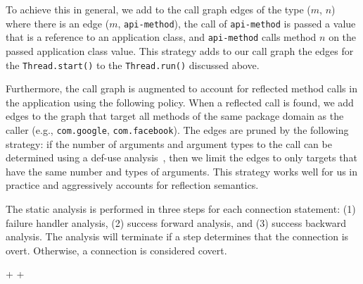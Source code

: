 To achieve this in general, we add to the call graph edges of the type
($m$, $n$) where there is an edge ($m$, \lstinline!api-method!), the
call of \lstinline!api-method! is passed a value that is a reference
to an application class, and \lstinline!api-method! calls method $n$
on the passed application class value.  This strategy adds to our
call graph the edges for the \lstinline!Thread.start()! to the
\lstinline!Thread.run()! discussed above.

Furthermore, the call graph is augmented to account for reflected
method calls in the application using the following policy.  When a
reflected call is found, we add edges to the graph that target all
methods of the same package domain as the caller (e.g.,
\lstinline!com.google!, \lstinline!com.facebook!).  The edges are pruned by the
following strategy: if the number of arguments and argument types to
the call can be determined using a def-use analysis~\cite{Aho2006},
then we limit the edges to only targets that have the same number and
types of arguments.  This strategy works well for us in
practice and aggressively accounts for reflection semantics.

The static analysis is performed in three steps for each connection
statement: (1) failure handler analysis, (2) success forward analysis,
and (3) success backward analysis.  The analysis will terminate if a
step determines that the connection is overt. Otherwise, a
connection is considered covert.

\lstDeleteShortInline+
\lstMakeShortInline[basicstyle=\scriptsize\ttfamily,keywordstyle=\color{DarkPurple},breaklines=true]+

